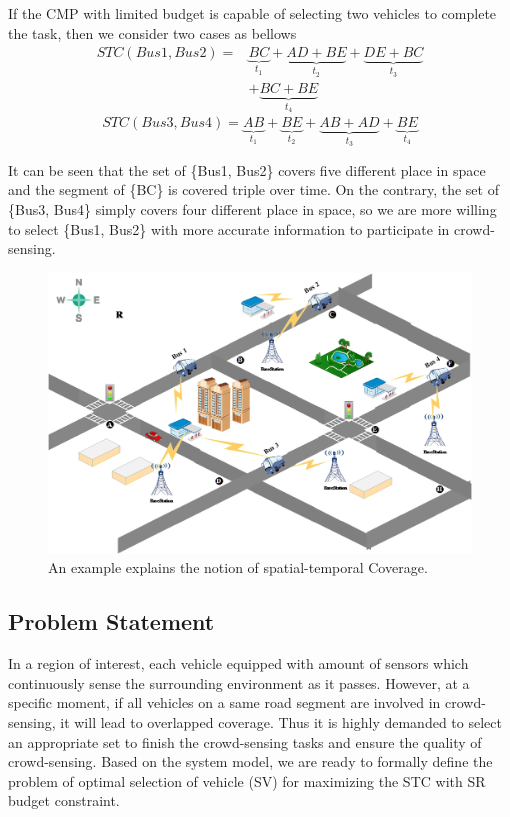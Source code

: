 \documentclass[journal]{IEEEtran}
\begin{document}
If the CMP with limited budget is capable of selecting two vehicles to complete the task, then we consider two cases as bellows
\begin{equation}
\begin{aligned}
STC({Bus1,Bus2})=& \underset{t_{1}}{\underbrace{BC}}+\underset{t_{2}}{\underbrace{AD+BE}}+\underset{t_{3}}{\underbrace{DE+BC}}\\&+\underset{t_{4}}{\underbrace{BC+BE}}
\end{aligned}
\end{equation}
\begin{equation}
STC({Bus3,Bus4})= \underset{t_{1}}{\underbrace{AB}}+\underset{t_{2}}{\underbrace{BE}}+\underset{t_{3}}{\underbrace{AB+AD}}+\underset{t_{4}}{\underbrace{BE}}
\end{equation}

It can be seen that the set of \{Bus1, Bus2\} covers five different place in space and the segment of \{BC\} is covered triple over time. On the contrary, the set of \{Bus3, Bus4\} simply covers four different place in space, so we are more willing to select \{Bus1, Bus2\} with more accurate information to participate in crowd-sensing.
\begin{figure}[t]
	\centering
	\includegraphics[width=1\linewidth]{Fig2(2).png}
	\caption{An example explains the notion of spatial-temporal Coverage.}
	\label{fig:figure4}
\end{figure}	

\subsection{Problem Statement} 
In a region of interest, each vehicle equipped with amount of sensors which continuously sense the surrounding environment as it passes. However, at a specific moment, if all vehicles on a same road segment are involved in crowd-sensing, it will lead to overlapped coverage. Thus it is highly demanded to select an appropriate set to finish the crowd-sensing tasks and ensure the quality of crowd-sensing. Based on the system model, we are ready to formally define the problem of optimal selection of vehicle (SV) for maximizing the STC with SR budget constraint.	
\end{document}
